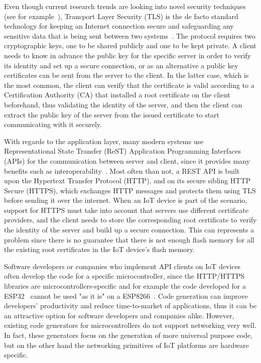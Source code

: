 \documentclass[manuscript,screen]{acmart}
\begin{document}
Even though current research trends are looking into novel security techniques (see for example~\cite{frimpong2020secon}), Transport Layer Security (TLS) is the de facto standard technology for keeping an
Internet connection secure and safeguarding any sensitive data that is being sent between two systems~\cite{SSL_TLS}. The protocol requires two cryptographic keys, one to be shared publicly and one to be kept private. A client needs to know in advance the public key for the specific server in order to verify its identity and set up a secure connection, or as an alternative a public key certificates can be sent from the server to the client. In the latter case, which is the most common, the client can verify that the certificate is valid according to a Certification Authority (CA) that installed a root certificate on the client beforehand, thus validating the identity of the server, and then the client can extract the public key of the server from the issued certificate to start communicating with it securely.~\cite{tlsmastery}




With regards to the application layer, many modern systems use Representational State Transfer (ReST) Application Programming Interfaces (APIs) for the communication between server and client, since it provides many benefits such as interoperability~\cite{costa2014evaluating}. Most often than not, a REST API is built upon the Hypertext Transfer Protocol (HTTP)\cite{yannakopoulos2003hypertext}, and on its secure sibling HTTP Secure (HTTPS), which exchanges HTTP messages and protects them using TLS before sending it over the internet. 
%
When an IoT device is part of the scenario, support for HTTPS must take into account that servers use different certificate providers, and the client needs to store the corresponding root certificate to verify the identity of the server and build up a secure connection. This can represents a problem since there is no guarantee that there is not enough flash memory for all the existing root certificates in the IoT device's flash memory. 

Software developers or companies who implement API clients on IoT devices often develop the code for a specific microcontroller, since the HTTP/HTTPS libraries are microcontrollers-specific and for example the code developed for a ESP32~\cite{Esp32HTTPClient} cannot be used "as it is" on a ESP8266~\cite{Esp8266HTTPClient}. 
%
Code generation can improve developers' productivity and reduce time-to-market of applications, thus it can be an attractive option for software developers and companies alike. 
%
However, existing code generators for microcontrollers do not support networking very well. In fact,
these generators focus on the generation of more universal purpose code, but on the other hand the networking primitives of IoT platforms are hardware specific. 
\end{document}
